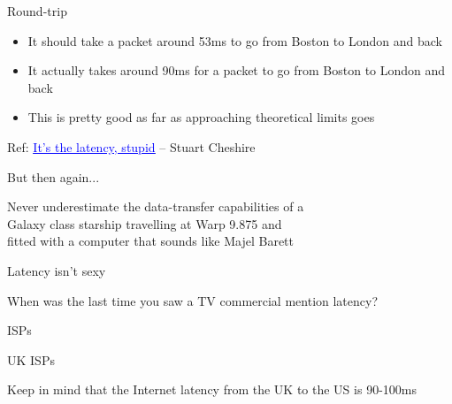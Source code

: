 \documentclass{beamer}
\begin{document}
\begin{frame}{Round-trip}
  \begin{itemize}
  \item It should take a packet around 53ms to go from Boston to London and back 
  \item It actually takes around 90ms for a packet to go from Boston to London and back
  \item<2-> This is pretty good as far as approaching theoretical limits goes
  \end{itemize}
  \vfill
  \tiny{Ref: \href{http://www.stuartcheshire.org/rants/Latency.html}{\textcolor{blue}{\underline{It's the latency, stupid}}} -- Stuart Cheshire}
\end{frame}

\begin{frame}{But then again...}
\begin{center}
Never underestimate the data-transfer capabilities of a \\ Galaxy class starship travelling at Warp 9.875 and \\ fitted with a computer that sounds like Majel Barett
\end{center}
\end{frame}

\begin{frame}{Latency isn't sexy}
  \begin{center}
  When was the last time you saw a TV commercial mention latency?
  \end{center}
\end{frame}

\begin{frame}{ISPs}
\end{frame}

\begin{frame}{UK ISPs}
  \parbox[c][1.5\paperheight]{\paperwidth} { }
  \tiny{Keep in mind that the Internet latency from the UK to the US is 90-100ms}
\end{frame}
\end{document}
